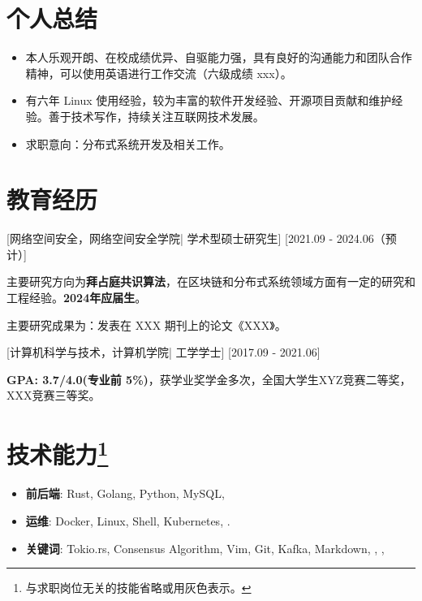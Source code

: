 \documentclass{resume}
\begin{document}

\ResumeTitle

\section{个人总结}

\begin{itemize}
  \item 本人乐观开朗、在校成绩优异、自驱能力强，具有良好的沟通能力和团队合作精神，可以使用英语进行工作交流（六级成绩 xxx）。
  \item 有六年 Linux 使用经验，较为丰富的软件开发经验、开源项目贡献和维护经验。善于技术写作，持续关注互联网技术发展。
  \item 求职意向：分布式系统开发及相关工作。
\end{itemize}

\section{教育经历}
[\textnormal{网络空间安全，网络空间安全学院|}  学术型硕士研究生]
[2021.09 - 2024.06（预计）]

主要研究方向为\textbf{拜占庭共识算法}，在区块链和分布式系统领域方面有一定的研究和工程经验。\textbf{2024年应届生}。

主要研究成果为：发表在 XXX 期刊上的论文《XXX》。

[\textnormal{计算机科学与技术，计算机学院|} 工学学士]
[2017.09 - 2021.06]

\textbf{GPA: 3.7/4.0(专业前 5\%)}，获学业奖学金多次，全国大学生XYZ竞赛二等奖，XXX竞赛三等奖。


\section[技术能力]{技术能力\protect\footnote{与求职岗位无关的技能省略或用灰色表示。}}
\begin{itemize}
  \item \textbf{前后端}: Rust, Golang, Python, MySQL, 
  \item \textbf{运维}: Docker, Linux, Shell, Kubernetes, .
  \item \textbf{关键词}: Tokio.rs, Consensus Algorithm, Vim, Git, Kafka, Markdown, , \GrayText{\LaTeX}, 
\end{itemize}
\end{document}
